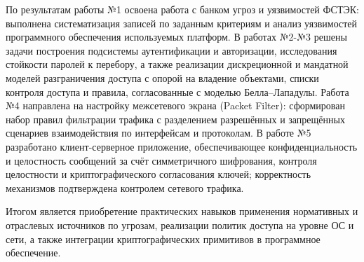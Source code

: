 \documentclass[areasetadvanced]{scrartcl}
\begin{document}
По результатам работы №1 освоена работа с банком угроз и уязвимостей ФСТЭК: выполнена систематизация записей по заданным критериям и анализ уязвимостей программного обеспечения используемых платформ. В работах №2-№3 решены задачи построения подсистемы аутентификации и авторизации, исследования стойкости паролей к перебору, а также реализации дискреционной и мандатной моделей разграничения доступа с опорой на владение объектами, списки контроля доступа и правила, согласованные с моделью Белла--Лападулы. Работа №4 направлена на настройку межсетевого экрана (Packet Filter): сформирован набор правил фильтрации трафика с разделением разрешённых и запрещённых сценариев взаимодействия по интерфейсам и протоколам. В работе №5 разработано клиент-серверное приложение, обеспечивающее конфиденциальность и целостность сообщений за счёт симметричного шифрования, контроля целостности и криптографического согласования ключей; корректность механизмов подтверждена контролем сетевого трафика.

Итогом является приобретение практических навыков применения нормативных и отраслевых источников по угрозам, реализации политик доступа на уровне ОС и сети, а также интеграции криптографических примитивов в программное обеспечение.
\end{document}
